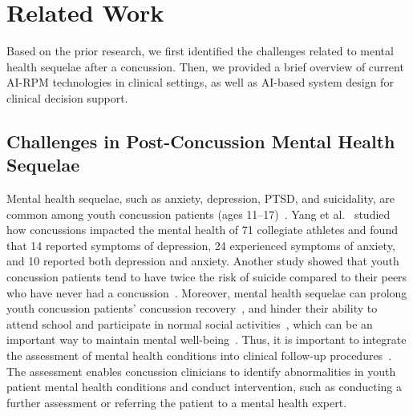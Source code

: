 \section{Related Work}
Based on the prior research, we first identified the challenges related to mental health sequelae after a concussion. 
Then, we provided a brief overview of current AI-RPM technologies in clinical settings, as well as AI-based system design for clinical decision support.

\subsection{Challenges in Post-Concussion Mental Health Sequelae  }
Mental health sequelae, such as anxiety, depression, PTSD, and suicidality, are common among youth concussion patients (ages 11–17)~\cite{stein2019risk, gornall2021mental, ledoux2022risk}. 
Yang et al.~\cite{yang2015post} studied how concussions impacted the mental health of 71 collegiate athletes and found that 14 reported symptoms of depression, 24 experienced symptoms of anxiety, and 10 reported both depression and anxiety. 
Another study showed that youth concussion patients tend to have twice the risk of suicide compared to their peers who have never had a concussion~\cite{fralick2019association}.
Moreover, mental health sequelae can prolong youth concussion patients' concussion recovery~\cite{silverberg2020management, iverson2003examination}, 
and hinder their ability to attend school and participate in normal social activities~\cite{iadevaia2015qualitative}, which can be an important way to maintain mental well-being~\cite{zamfir2015physical}.
Thus, it is important to integrate the assessment of mental health conditions into clinical follow-up procedures~\cite{gornall2021mental, russell2023incidence}. The assessment enables concussion clinicians to identify abnormalities in youth patient mental health conditions and conduct intervention, such as conducting a further assessment or referring the patient to a mental health expert. 

